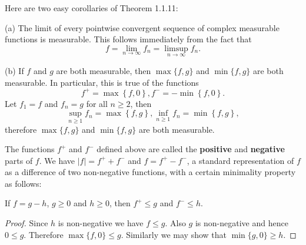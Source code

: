 Here are two easy corollaries of Theorem 1.1.11: \par
(a) The limit of every pointwise convergent sequence of complex measurable functions is measurable. This follows immediately from the fact that $$f=\lim_{n\to\infty}f_n=\limsup_{n\to\infty}f_n.$$\par
(b) If $f$ and $g$ are both measurable, then $\max\{f,g\}$ and $\min\{f,g\}$ are both measurable. In particular, this is true of the functions 
$$
f^+=\max \left\{ f,0 \right\} ,f^-=-\min \left\{ f,0 \right\} .
$$
Let $f_1=f$ and $f_n=g$ for all $n\ge 2$, then 
$$
\mathop {\mathrm{sup}} \limits_{n\ge 1}f_n=\max \left\{ f,g \right\} ,\mathop {\mathrm{inf}} \limits_{n\ge 1}f_n=\min \left\{ f,g \right\} ,
$$
therefore $\max\{f,g\}$ and $\min\{f,g\}$ are both measurable.\par
The functions $f^+$ and $f^-$ defined above are called the \textbf{positive} and \textbf{negative} parts of $f$. We have $|f|=f^++f^-$ and $f=f^+-f^-$, a standard representation of $f$ as a difference of two non-negative functions, with a certain minimality property as follows:
\begin{proposition}
If $f=g-h$, $g\ge 0$ and $h\ge 0$, then $f^+\le g$ and $f^-\le h$.
\end{proposition}
\begin{proof}
Since $h$ is non-negative we have $f\le g$. Also $g$ is non-negative and hence $0\le g$. Therefore $\max\{f,0\}\le g$. Similarly we may show that $\min\{g,0\}\ge h$.
\end{proof}
